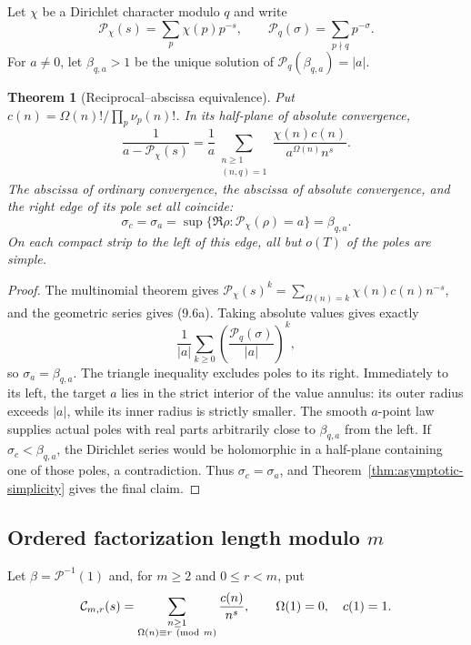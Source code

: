 \documentclass[11pt]{article}
\newtheorem{theorem}{Theorem}[section]
\theoremstyle{definition}
\theoremstyle{remark}
\newcommand{\cP}{\mathcal P}
\begin{document}
Let $\chi$ be a Dirichlet character modulo $q$ and write
\[
 \cP_\chi(s)=\sum_p\chi(p)p^{-s},\qquad
 \cP_q(\sigma)=\sum_{p\nmid q}p^{-\sigma}.
\]
For $a\ne0$, let $\beta_{q,a}>1$ be the unique solution of
$\cP_q(\beta_{q,a})=|a|$.

\begin{theorem}[Reciprocal--abscissa equivalence]
\label{thm:reciprocal-abscissa}
Put $c(n)=\Omega(n)!/\prod_p\nu_p(n)!$.  In its half-plane of absolute convergence,
\[
 \boxed{
 \frac1{a-\cP_\chi(s)}
 =\frac1a\sum_{\substack{n\ge1\\(n,q)=1}}
 \frac{\chi(n)c(n)}{a^{\Omega(n)}n^s}.
 }
\tag{9.6a}
\]
The abscissa of ordinary convergence, the abscissa of absolute convergence, and the
right edge of its pole set all coincide:
\[
 \boxed{
 \sigma_c=\sigma_a
 =\sup\{\Re\rho:\cP_\chi(\rho)=a\}
 =\beta_{q,a}.
 }
\tag{9.6b}
\]
On each compact strip to the left of this edge, all but $o(T)$ of the poles are simple.
\end{theorem}

\begin{proof}
The multinomial theorem gives
$\cP_\chi(s)^k=\sum_{\Omega(n)=k}\chi(n)c(n)n^{-s}$, and the geometric series gives
(9.6a).  Taking absolute values gives exactly
\[
 \frac1{|a|}\sum_{k\ge0}\left(\frac{\cP_q(\sigma)}{|a|}\right)^k,
\]
so $\sigma_a=\beta_{q,a}$.  The triangle inequality excludes poles to its right.
Immediately to its left, the target $a$ lies in the strict interior of the value
annulus: its outer radius exceeds $|a|$, while its inner radius is strictly smaller.
The smooth $a$-point law supplies actual poles with real parts arbitrarily close to
$\beta_{q,a}$ from the left.  If $\sigma_c<\beta_{q,a}$, the Dirichlet series would be
holomorphic in a half-plane containing one of those poles, a contradiction.  Thus
$\sigma_c=\sigma_a$, and Theorem~\ref{thm:asymptotic-simplicity} gives the final claim.
\end{proof}

\subsection{Ordered factorization length modulo \texorpdfstring{$m$}{m}}

Let $\beta=\cP^{-1}(1)$ and, for $m\ge2$ and $0\le r<m$, put
\[
 \mathcal C_{m,r}(s)=
 \sum_{\substack{n\ge1\\\Omega(n)\equiv r\ ({\rm mod}\ m)}}\frac{c(n)}{n^s},
 \qquad \Omega(1)=0,\quad c(1)=1.
\]
\end{document}
